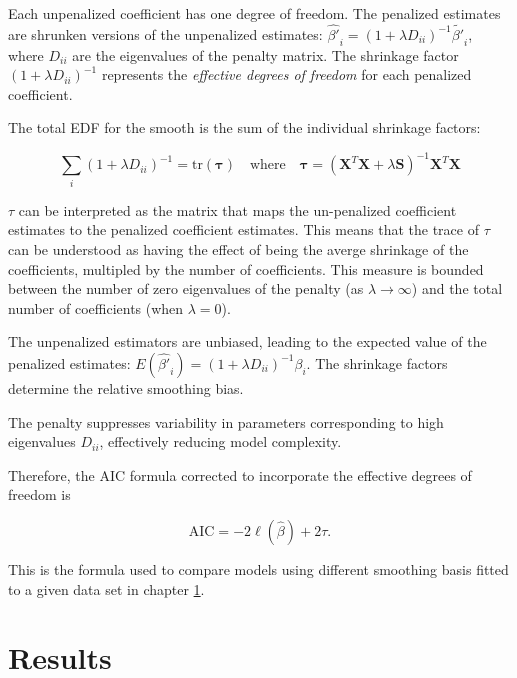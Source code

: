 \documentclass[
11pt, %
oneside, %
english, %
singlespacing, %
]{macthesis} %
\begin{document}
Each unpenalized coefficient has one degree of freedom. The penalized estimates are shrunken versions of the unpenalized estimates: \(\hat{\beta'}_i = (1 + \lambda D_{ii})^{-1} \tilde{\beta'}_i\), where \(D_{ii}\) are the eigenvalues of the penalty matrix. The shrinkage factor \((1 + \lambda D_{ii})^{-1}\) represents the \emph{effective degrees of freedom} for each penalized coefficient.

The total EDF for the smooth is the sum of the individual shrinkage factors:

\[
\sum_i (1 + \lambda D_{ii})^{-1} = \text{tr}(\mathbf{\tau}) \quad \text{where} \quad \mathbf{\tau} = (\mathbf{X}^T \mathbf{X} + \lambda \mathbf{S})^{-1} \mathbf{X}^T \mathbf{X}
\]

\(\tau\) can be interpreted as the matrix that maps the un-penalized coefficient estimates to the penalized coefficient estimates. This means that the trace of \(\tau\) can be understood as having the effect of being the averge shrinkage of the coefficients, multipled by the number of coefficients. This measure is bounded between the number of zero eigenvalues of the penalty (as \(\lambda \to \infty\)) and the total number of coefficients (when \(\lambda = 0\)).

The unpenalized estimators are unbiased, leading to the expected value of the penalized estimates: \(E(\hat{\beta'}_i) = (1 + \lambda D_{ii})^{-1} \beta_i\). The shrinkage factors determine the relative smoothing bias.

The penalty suppresses variability in parameters corresponding to high eigenvalues \(D_{ii}\), effectively reducing model complexity.

Therefore, the AIC formula corrected to incorporate the effective degrees of freedom is

\begin{equation}
\text{AIC} = -2 \ell(\hat{\beta}) + 2 \tau.
\label{eq:corrected AIC}
\end{equation}

This is the formula used to compare models using different smoothing basis fitted to a given data set in chapter \ref{Results}.

\chapter{Results}\label{Results}
\end{document}
